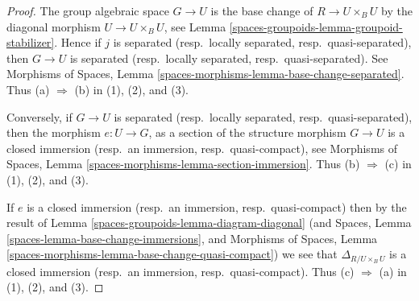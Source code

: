 \begin{proof}
The group algebraic space $G \to U$ is the base change of $R \to U \times_B U$
by the diagonal morphism $U \to U \times_B U$, see
Lemma \ref{spaces-groupoids-lemma-groupoid-stabilizer}. Hence if
$j$ is separated (resp.\ locally separated, resp.\ quasi-separated),
then $G \to U$ is separated (resp.\ locally separated, resp.\ quasi-separated).
See
Morphisms of Spaces, Lemma
\ref{spaces-morphisms-lemma-base-change-separated}.
Thus (a) $\Rightarrow$ (b) in (1), (2), and (3).

\medskip\noindent
Conversely, if $G \to U$ is separated
(resp.\ locally separated, resp.\ quasi-separated), then the morphism
$e : U \to G$, as a section of the structure morphism $G \to U$ is a closed
immersion (resp.\ an immersion, resp.\ quasi-compact), see
Morphisms of Spaces, Lemma \ref{spaces-morphisms-lemma-section-immersion}.
Thus (b) $\Rightarrow$ (c) in (1), (2), and (3).

\medskip\noindent
If $e$ is a closed immersion (resp.\ an immersion, resp.\ quasi-compact)
then by the result of
Lemma \ref{spaces-groupoids-lemma-diagram-diagonal}
(and
Spaces, Lemma \ref{spaces-lemma-base-change-immersions}, and
Morphisms of Spaces,
Lemma \ref{spaces-morphisms-lemma-base-change-quasi-compact})
we see that $\Delta_{R/U \times_B U}$ is a closed
immersion (resp.\ an immersion, resp.\ quasi-compact).
Thus (c) $\Rightarrow$ (a) in (1), (2), and (3).
\end{proof}




